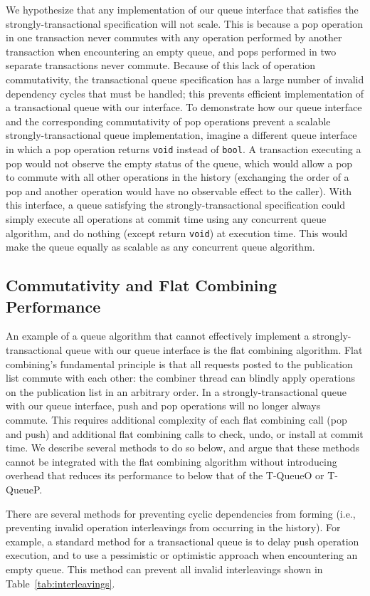 We hypothesize that any implementation of our queue interface that satisfies the strongly-transactional specification will not scale. This is because a pop operation in one transaction never commutes with any operation performed by another transaction when encountering an empty queue, and pops performed in two separate transactions never commute. Because of this lack of operation commutativity, the transactional queue specification has a large number of invalid dependency cycles that must be handled; this prevents efficient implementation of a transactional queue with our interface. To demonstrate how our queue interface and the corresponding commutativity of pop operations prevent a scalable strongly-transactional queue implementation, imagine a different queue interface in which a pop operation returns \texttt{void} instead of \texttt{bool}. A transaction executing a pop would not observe the empty status of the queue, which would allow a pop to commute with all other operations in the history (exchanging the order of a pop and another operation would have no observable effect to the caller). With this interface, a queue satisfying the strongly-transactional specification could simply execute all operations at commit time using any concurrent queue algorithm, and do nothing (except return \texttt{void}) at execution time. This would make the queue equally as scalable as any concurrent queue algorithm.

\subsection{Commutativity and Flat Combining Performance}
An example of a queue algorithm that cannot effectively implement a strongly-transactional queue with our queue interface is the flat combining algorithm. 
Flat combining's fundamental principle is that all requests posted to the publication list commute with each other: the combiner thread can blindly apply operations on the publication list in an arbitrary order. In a strongly-transactional queue with our queue interface, push and pop operations will no longer always commute.
This requires additional complexity of each flat combining call (pop and push) and additional flat combining calls to check, undo, or install at commit time. We describe several methods to do so below, and argue that these methods cannot be integrated with the flat combining algorithm without introducing overhead that reduces its performance to below that of the T-QueueO or T-QueueP.

There are several methods for preventing cyclic dependencies from forming (i.e., preventing invalid operation interleavings from occurring in the history). For example, a standard method for a transactional queue is to delay push operation execution, and to use a pessimistic or optimistic approach when encountering an empty queue. This method can prevent all invalid interleavings shown in Table~\ref{tab:interleavings}.

